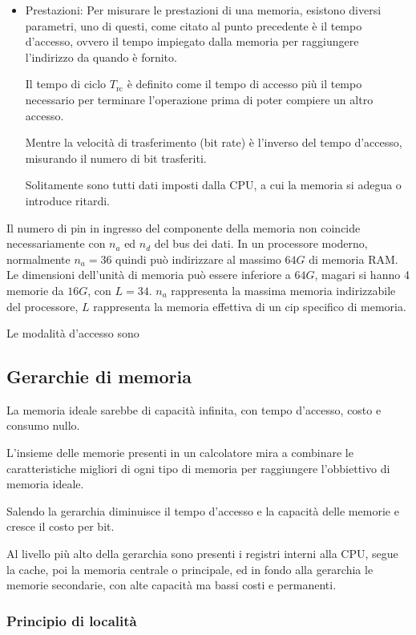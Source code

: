 \documentclass[../template]{subfiles}
\begin{document}
\begin{itemize}
    \item Prestazioni:
        Per misurare le prestazioni di una memoria, esistono diversi parametri, uno di questi, come citato al punto precedente è il tempo d'accesso,  ovvero il tempo impiegato dalla memoria per raggiungere l'indirizzo da quando è fornito.

        Il tempo di ciclo $T_\text{rc}$ è definito come il tempo di accesso più il tempo necessario per terminare l'operazione prima di poter compiere un altro accesso.

        Mentre la velocità di trasferimento (bit rate) è l'inverso del tempo d'accesso, misurando il numero di bit trasferiti.

        Solitamente sono tutti dati imposti dalla CPU, a cui la memoria si adegua o introduce ritardi.

\end{itemize}

Il numero di pin in ingresso del componente della memoria non coincide necessariamente con $n_a$ ed $n_d$ del bus dei dati.
In un processore moderno, normalmente $n_a = 36$ quindi può indirizzare al massimo $64G$ di memoria RAM. Le dimensioni dell'unità di memoria può essere inferiore a $64G$, magari si hanno 4 memorie da $16G$, con $L=34$. $n_a$ rappresenta la massima memoria indirizzabile del processore, $L$ rappresenta la memoria effettiva di un cip specifico di memoria.

Le modalità d'accesso sono


\subsection{Gerarchie di memoria}
La memoria ideale sarebbe di capacità infinita, con tempo d'accesso, costo e consumo nullo.

L'insieme delle memorie presenti in un calcolatore mira a combinare le caratteristiche migliori di ogni tipo di memoria per raggiungere l'obbiettivo di memoria ideale.

Salendo la gerarchia diminuisce il tempo d'accesso e la capacità delle memorie e cresce il costo per bit.

Al livello più alto della gerarchia sono presenti i registri interni alla CPU, segue la cache, poi la memoria centrale o principale, ed in fondo alla gerarchia le memorie secondarie, con alte capacità ma bassi costi e permanenti.
\subsubsection{Principio di località}
\end{document}
